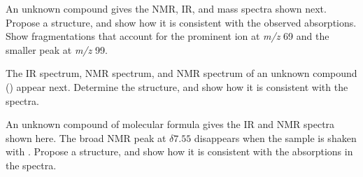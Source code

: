 \begin{example} %
    An unknown compound gives the NMR, IR, and mass spectra shown next. Propose a structure, and show how it is  consistent with the observed absorptions. Show fragmentations that account for the prominent ion at \textit{m/z} 69 and the smaller peak at \textit{m/z} 99.

\end{example}

\begin{example} %
    The IR spectrum,  NMR spectrum, and  NMR spectrum of an unknown compound () appear next.  Determine the structure, and show how it is consistent with the spectra.

\end{example}

\begin{example} %
    An unknown compound of molecular formula  gives the IR and NMR spectra shown here. The broad NMR peak at $\delta 7.55$ disappears when the sample is shaken with . Propose a structure, and show how it is consistent with the absorptions in the spectra.
\end{example}
